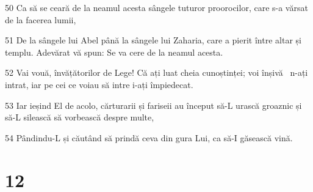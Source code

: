 \par 50 Ca să se ceară de la neamul acesta sângele tuturor proorocilor, care s-a vărsat de la facerea lumii,
\par 51 De la sângele lui Abel până la sângele lui Zaharia, care a pierit între altar și templu. Adevărat vă spun: Se va cere de la neamul acesta.
\par 52 Vai vouă, învățătorilor de Lege! Că ați luat cheia cunoștinței; voi înșivă  n-ați intrat, iar pe cei ce voiau să intre i-ați împiedecat.
\par 53 Iar ieșind El de acolo, cărturarii și fariseii au început să-L urască groaznic și să-L silească să vorbească despre multe,
\par 54 Pândindu-L și căutând să prindă ceva din gura Lui, ca să-I găsească vină.

\chapter{12}

